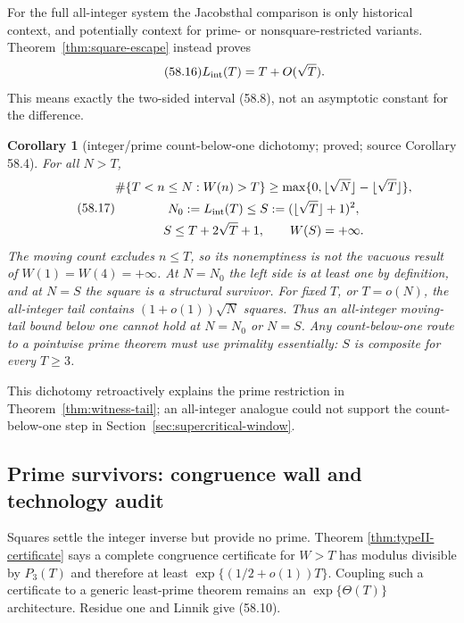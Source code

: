 \documentclass[10pt,reqno]{amsart}
\newtheorem{corollary}[theorem]{Corollary}
\theoremstyle{definition}
\newcommand{\1}{\mathbf 1}
\begin{document}
For the full all-integer system the Jacobsthal comparison is only historical
context, and potentially context for prime- or nonsquare-restricted
variants.  Theorem~\ref{thm:square-escape} instead proves
\begin{equation}\tag{58.16}
                         L_{\rm int}(T)=T+O(\sqrt T).
\end{equation}
This means exactly the two-sided interval (58.8), not an asymptotic constant
for the difference.

\begin{corollary}[integer/prime count-below-one dichotomy; proved; source
Corollary 58.4]\label{cor:integer-prime-dichotomy}
For all $N>T$,
\begin{equation}\tag{58.17}
 \begin{gathered}
 \#\{T<n\leq N:W(n)>T\}
 \geq\max\{0,\lfloor\sqrt N\rfloor-\lfloor\sqrt T\rfloor\},\\
 N_0:=L_{\rm int}(T)\leq S:=(\lfloor\sqrt T\rfloor+1)^2,\\
 S\leq T+2\sqrt T+1,\qquad W(S)=+\infty.
 \end{gathered}
\end{equation}
The moving count excludes $n\leq T$, so its nonemptiness is not the vacuous
result of $W(1)=W(4)=+\infty$.  At $N=N_0$ the left side is at least one by
definition, and at $N=S$ the square is a structural survivor.  For fixed
$T$, or $T=o(N)$, the all-integer tail contains
$(1+o(1))\sqrt N$ squares.  Thus an all-integer moving-tail bound below one
cannot hold at $N=N_0$ or $N=S$.  Any count-below-one route to a pointwise
prime theorem must use primality essentially: $S$ is composite for every
$T\geq3$.
\end{corollary}
This dichotomy retroactively explains the prime restriction in
Theorem~\ref{thm:witness-tail}; an all-integer analogue could not support the
count-below-one step in Section~\ref{sec:supercritical-window}.

\subsection{Prime survivors: congruence wall and technology audit}
Squares settle the integer inverse but provide no prime.  Theorem
\ref{thm:typeII-certificate} says a complete congruence certificate for
$W>T$ has modulus divisible by $P_3(T)$ and therefore at least
$\exp\{(1/2+o(1))T\}$.  Coupling such a certificate to a generic least-prime
theorem remains an $\exp\{\Theta(T)\}$ architecture.  Residue one and
Linnik give (58.10).
\end{document}
